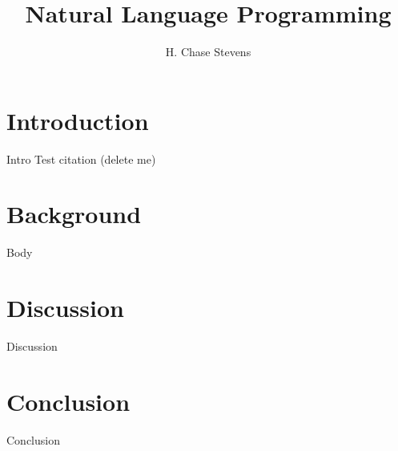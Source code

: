 \documentclass[a4paper,11pt]{proposal}
\title{Natural Language Programming}
\author{H. Chase Stevens}
\begin{document}
\maketitle 
\parindent=0mm


\setcounter{tocdepth}{2}

\clearpage
{}
\newpage


\setlength{\parskip}{1ex} 


\section{Introduction} \label{sec:intro}

Intro 
Test citation (delete me) \cite{Yehia2002}

\section{Background} \label{sec:back}
Body

\section{Discussion} \label{sec:disc}
Discussion

\section{Conclusion} \label{sec:conc}
Conclusion


\newpage


\end{document}
